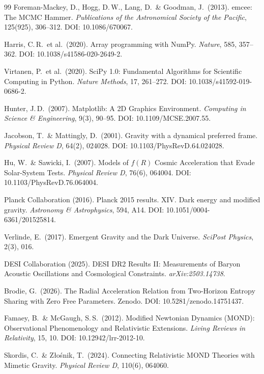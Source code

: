 \documentclass[aps,prd,twocolumn,superscriptaddress,nofootinbib]{revtex4-2}
\begin{document}
\begin{thebibliography}{99}
Foreman-Mackey, D., Hogg, D.\,W., Lang, D.\ \& Goodman, J.\ (2013).
emcee: The MCMC Hammer.
\textit{Publications of the Astronomical Society of the Pacific}, 125(925), 306--312.
DOI: 10.1086/670067.

Harris, C.\,R.\ et al.\ (2020).
Array programming with NumPy.
\textit{Nature}, 585, 357--362.
DOI: 10.1038/s41586-020-2649-2.

Virtanen, P.\ et al.\ (2020).
SciPy 1.0: Fundamental Algorithms for Scientific Computing in Python.
\textit{Nature Methods}, 17, 261--272.
DOI: 10.1038/s41592-019-0686-2.

Hunter, J.\,D.\ (2007).
Matplotlib: A 2D Graphics Environment.
\textit{Computing in Science \& Engineering}, 9(3), 90--95.
DOI: 10.1109/MCSE.2007.55.

Jacobson, T.\ \& Mattingly, D.\ (2001).
Gravity with a dynamical preferred frame.
\textit{Physical Review D}, 64(2), 024028.
DOI: 10.1103/PhysRevD.64.024028.

Hu, W.\ \& Sawicki, I.\ (2007).
Models of $f(R)$ Cosmic Acceleration that Evade Solar-System Tests.
\textit{Physical Review D}, 76(6), 064004.
DOI: 10.1103/PhysRevD.76.064004.

Planck Collaboration (2016).
Planck 2015 results. XIV. Dark energy and modified gravity.
\textit{Astronomy \& Astrophysics}, 594, A14.
DOI: 10.1051/0004-6361/201525814.

Verlinde, E.\ (2017).
Emergent Gravity and the Dark Universe.
\textit{SciPost Physics}, 2(3), 016.

DESI Collaboration (2025).
DESI DR2 Results II: Measurements of Baryon Acoustic Oscillations and Cosmological Constraints.
\textit{arXiv:2503.14738}.

Brodie, G.\ (2026).
The Radial Acceleration Relation from Two-Horizon Entropy Sharing with Zero Free Parameters.
Zenodo. DOI: 10.5281/zenodo.14751437.

Famaey, B.\ \& McGaugh, S.\,S.\ (2012).
Modified Newtonian Dynamics (MOND): Observational Phenomenology and Relativistic Extensions.
\textit{Living Reviews in Relativity}, 15, 10.
DOI: 10.12942/lrr-2012-10.

Skordis, C.\ \& Z{\l}o\'snik, T.\ (2024).
Connecting Relativistic MOND Theories with Mimetic Gravity.
\textit{Physical Review D}, 110(6), 064060.

\end{thebibliography}
\end{document}
